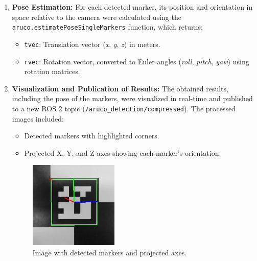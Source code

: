 \begin{enumerate}
        \item \textbf{Pose Estimation:} 
        For each detected marker, its position and orientation in space relative to the camera were calculated using the \texttt{aruco.estimatePoseSingleMarkers} function, which returns:
        \begin{itemize}
            \item \texttt{tvec}: Translation vector (\textit{x}, \textit{y}, \textit{z}) in meters.
            \item \texttt{rvec}: Rotation vector, converted to Euler angles (\textit{roll}, \textit{pitch}, \textit{yaw}) using rotation matrices.
        \end{itemize}
        \begin{center}
            \begin{figure}[H]
                \centering
            \end{figure}
        \end{center}
    
        \item \textbf{Visualization and Publication of Results:} 
        The obtained results, including the pose of the markers, were visualized in real-time and published to a new ROS 2 topic (\texttt{/aruco\_detection/compressed}). The processed images included:
        \begin{itemize}
            \item Detected markers with highlighted corners.
            \item Projected X, Y, and Z axes showing each marker's orientation.
        \end{itemize}
        \begin{center}
            \begin{figure}[H]
                \centering
                \includegraphics[width=0.4\textwidth]{pictures/aruco_detection.png}
                \caption{Image with detected markers and projected axes.}
            \end{figure}
        \end{center}
    

\end{enumerate}
